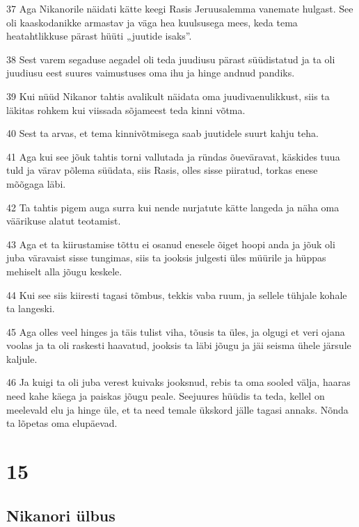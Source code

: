 \par 37 Aga Nikanorile näidati kätte keegi Rasis Jeruusalemma vanemate hulgast. See oli kaaskodanikke armastav ja väga hea kuulsusega mees, keda tema heatahtlikkuse pärast hüüti „juutide isaks”.
\par 38 Sest varem segaduse aegadel oli teda juudiusu pärast süüdistatud ja ta oli juudiusu eest suures vaimustuses oma ihu ja hinge andnud pandiks.
\par 39 Kui nüüd Nikanor tahtis avalikult näidata oma juudivaenulikkust, siis ta läkitas rohkem kui viissada sõjameest teda kinni võtma.
\par 40 Sest ta arvas, et tema kinnivõtmisega saab juutidele suurt kahju teha.
\par 41 Aga kui see jõuk tahtis torni vallutada ja ründas õueväravat, käskides tuua tuld ja värav põlema süüdata, siis Rasis, olles sisse piiratud, torkas enese mõõgaga läbi.
\par 42 Ta tahtis pigem auga surra kui nende nurjatute kätte langeda ja näha oma väärikuse alatut teotamist.
\par 43 Aga et ta kiirustamise tõttu ei osanud enesele õiget hoopi anda ja jõuk oli juba väravaist sisse tungimas, siis ta jooksis julgesti üles müürile ja hüppas mehiselt alla jõugu keskele.
\par 44 Kui see siis kiiresti tagasi tõmbus, tekkis vaba ruum, ja sellele tühjale kohale ta langeski.
\par 45 Aga olles veel hinges ja täis tulist viha, tõusis ta üles, ja olgugi et veri ojana voolas ja ta oli raskesti haavatud, jooksis ta läbi jõugu ja jäi seisma ühele järsule kaljule.
\par 46 Ja kuigi ta oli juba verest kuivaks jooksnud, rebis ta oma sooled välja, haaras need kahe käega ja paiskas jõugu peale. Seejuures hüüdis ta teda, kellel on meelevald elu ja hinge üle, et ta need temale ükskord jälle tagasi annaks. Nõnda ta lõpetas oma elupäevad.



\chapter{15}


\section*{Nikanori ülbus}

